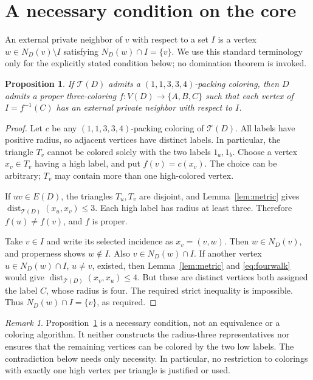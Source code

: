 \documentclass[11pt,a4paper]{article}
\newtheorem{proposition}[theorem]{Proposition}
\theoremstyle{definition}
\theoremstyle{remark}
\newtheorem{remark}[theorem]{Remark}
\newcommand{\V}{V}
\newcommand{\E}{E}
\newcommand{\NN}{N}
\newcommand{\Exp}{\mathcal{T}}
\newcommand{\palette}{(1,1,3,3,4)}
\newcommand{\high}{\{A,B,C\}}
\DeclareMathOperator{\dist}{dist}
\begin{document}
\section{A necessary condition on the core}

An external private neighbor of \(v\) with respect to a set \(I\)
is a vertex \(w\in\NN_D(v)\setminus I\) satisfying
\(\NN_D(w)\cap I=\{v\}\). We use this standard terminology only for
the explicitly stated condition below; no domination theorem is
invoked.

\begin{proposition}\label{prop:necessary}
If \(\Exp(D)\) admits a \(\palette\)-packing coloring, then \(D\)
admits a proper three-coloring \(f:\V(D)\to\high\) such that each
vertex of \(I=f^{-1}(C)\) has an external private neighbor with
respect to \(I\).
\end{proposition}

\begin{proof}
Let \(c\) be any \(\palette\)-packing coloring of \(\Exp(D)\).
All labels have positive radius, so adjacent vertices have distinct
labels. In particular, the triangle \(T_v\) cannot be colored solely
with the two labels \(1_a,1_b\). Choose a vertex \(x_v\in T_v\)
having a high label, and put \(f(v)=c(x_v)\).
The choice can be arbitrary; \(T_v\) may contain more than one
high-colored vertex.

If \(uv\in\E(D)\), the triangles \(T_u,T_v\) are disjoint, and
Lemma~\ref{lem:metric} gives \(\dist_{\Exp(D)}(x_u,x_v)\leq3\).
Each high label has radius at least three. Therefore \(f(u)\ne f(v)\),
and \(f\) is proper.

Take \(v\in I\) and write its selected incidence as \(x_v=(v,w)\).
Then \(w\in\NN_D(v)\), and properness shows \(w\notin I\).
Also \(v\in\NN_D(w)\cap I\). If another vertex
\(u\in\NN_D(w)\cap I\), \(u\ne v\), existed, then
Lemma~\ref{lem:metric} and \eqref{eq:fourwalk} would give
\(\dist_{\Exp(D)}(x_v,x_u)\leq4\).
But these are distinct vertices both assigned the label \(C\), whose
radius is four. The required strict inequality is impossible.
Thus \(\NN_D(w)\cap I=\{v\}\), as required.
\end{proof}

\begin{remark}\label{rem:necessity}
Proposition~\ref{prop:necessary} is a necessary condition, not an
equivalence or a coloring algorithm. It neither constructs the
radius-three representatives nor ensures that the remaining vertices
can be colored by the two low labels. The contradiction below needs
only necessity. In particular, no restriction to colorings with
exactly one high vertex per triangle is justified or used.
\end{remark}
\end{document}
